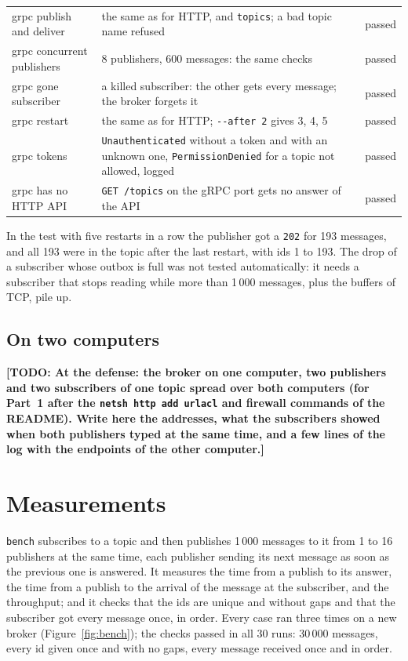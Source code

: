 \documentclass[11pt,a4paper]{article}
\newcommand{\TODO}[1]{\textcolor{wrong}{\textbf{[TODO: #1]}}}
\newcommand{\code}[1]{{\frenchspacing\texttt{#1}}}
\begin{document}
\begin{table}[tbp]
\begin{tabularx}{\linewidth}{@{}lXc@{}}
grpc publish and deliver & the same as for HTTP, and \code{topics}; a bad topic name refused & passed \\
grpc concurrent publishers & 8 publishers, 600 messages: the same checks & passed \\
grpc gone subscriber & a killed subscriber: the other gets every message; the broker forgets it & passed \\
grpc restart & the same as for HTTP; \code{-{}-after 2} gives 3, 4, 5 & passed \\
grpc tokens & \code{Unauthenticated} without a token and with an unknown one, \code{PermissionDenied} for a topic not allowed, logged & passed \\
grpc has no HTTP API & \code{GET /topics} on the gRPC port gets no answer of the API & passed \\
\bottomrule
\end{tabularx}
\end{table}

In the test with five restarts in a row the publisher got a \code{202} for 193 messages, and all 193 were
in the topic after the last restart, with ids 1 to 193. The drop of a subscriber whose outbox is full
was not tested automatically: it needs a subscriber that stops reading while more than 1\,000
messages, plus the buffers of TCP, pile up.

\subsection{On two computers}\label{sec:two}

\TODO{At the defense: the broker on one computer, two publishers and two subscribers of one topic
spread over both computers (for Part~1 after the \code{netsh http add urlacl} and firewall commands of
the README). Write here the addresses, what the subscribers showed when both publishers typed at the
same time, and a few lines of the log with the endpoints of the other computer.}

\section{Measurements}\label{sec:measure}

\code{bench} subscribes to a topic and then publishes 1\,000 messages to it from 1 to 16 publishers
at the same time, each publisher sending its next message as soon as the previous one is answered.
It measures the time from a publish to its answer, the time from a publish to the arrival of the
message at the subscriber, and the throughput; and it checks that the ids are unique and without
gaps and that the subscriber got every message once, in order. Every case ran three times on a new
broker (Figure~\ref{fig:bench}); the checks passed in all 30 runs: 30\,000 messages, every id given
once and with no gaps, every message received once and in order.
\end{document}
